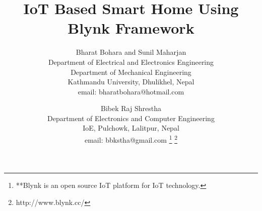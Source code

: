 \documentclass[journal,twoside]{IEEEtran}
\begin{document}
\setcounter{page}{26}
%
\title{IoT Based Smart Home Using Blynk Framework}
%
%
%

\author{
  Bharat Bohara and Sunil Maharjan\\
  Department of Electrical and Electronics Engineering\\
  Department of Mechanical Engineering\\
  Kathmandu University, Dhulikhel, Nepal\\
  email: bharatbohara@hotmail.com\\
  \and
  \vspace{0.4cm}
  Bibek Raj Shrestha\\
  Department of Electronics and Computer Engineering\\
  IoE, Pulchowk, Lalitpur, Nepal\\
  email: bbkstha@gmail.com
  \thanks{**Blynk \cite{Blynk2016} is an open source IoT platform for IoT technology.}%
    \thanks{http://www.blynk.cc/}
}

% 
%
\end{document}
